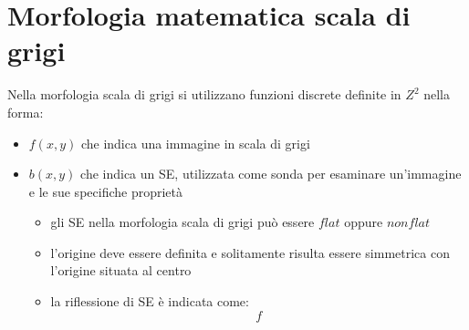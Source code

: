 \chapter{Morfologia matematica scala di grigi}
Nella morfologia scala di grigi si utilizzano funzioni discrete definite in $Z^2$ nella forma:
\begin{itemize}
	\item $f(x, y)$ che indica una immagine in scala di grigi
	
	\item $b(x, y)$ che indica un SE, utilizzata come sonda per esaminare un'immagine e le sue specifiche proprietà
	\begin{itemize}
		\item gli SE nella morfologia scala di grigi può essere $flat$ oppure $nonflat$
		\item l'origine deve essere definita e solitamente risulta essere simmetrica con l'origine situata al centro
		
		\item la riflessione di SE è indicata come:
		$$
		f
		$$
	\end{itemize}
\end{itemize}